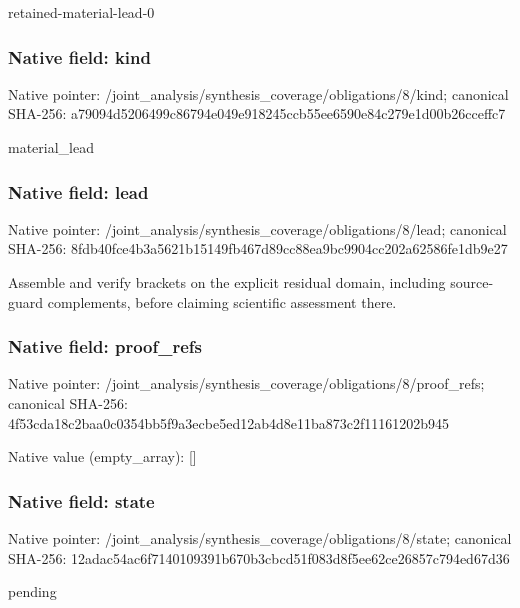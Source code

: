\documentclass[10pt,a4paper]{article}
\begin{document}
\begingroup\raggedright\sloppy retained-material-lead-0\par\endgroup

\subsubsection{Native field: kind}
Native pointer: /joint\_\allowbreak{}analysis/synthesis\_\allowbreak{}coverage/obligations/8/kind; canonical SHA-256: a79094d5206499c86794e049e918245ccb55ee6590e84c279e1d00b26cceffc7

\begingroup\raggedright\sloppy material\_\allowbreak{}lead\par\endgroup

\subsubsection{Native field: lead}
Native pointer: /joint\_\allowbreak{}analysis/synthesis\_\allowbreak{}coverage/obligations/8/lead; canonical SHA-256: 8fdb40fce4b3a5621b15149fb467d89cc88ea9bc9904cc202a62586fe1db9e27

\begingroup\raggedright\sloppy Assemble and verify brackets on the explicit residual domain,\allowbreak{} including source-guard complements,\allowbreak{} before claiming scientific assessment there.\par\endgroup

\subsubsection{Native field: proof\_\allowbreak{}refs}
Native pointer: /joint\_\allowbreak{}analysis/synthesis\_\allowbreak{}coverage/obligations/8/proof\_\allowbreak{}refs; canonical SHA-256: 4f53cda18c2baa0c0354bb5f9a3ecbe5ed12ab4d8e11ba873c2f11161202b945

Native value (empty\_\allowbreak{}array): []

\subsubsection{Native field: state}
Native pointer: /joint\_\allowbreak{}analysis/synthesis\_\allowbreak{}coverage/obligations/8/state; canonical SHA-256: 12adac54ac6f7140109391b670b3cbcd51f083d8f5ee62ce26857c794ed67d36

\begingroup\raggedright\sloppy pending\par\endgroup
\end{document}
